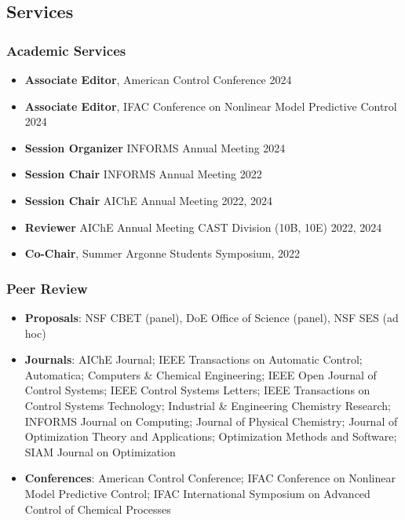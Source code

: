 \subsection*{Services}
\subsubsection*{Academic Services}
\begin{itemize}[leftmargin=*,itemsep=-1pt]
  \item[] \textbf{Associate Editor}, American Control Conference \hfill 2024
  \item[] \textbf{Associate Editor}, IFAC Conference on Nonlinear Model Predictive Control \hfill 2024
\item[] \textbf{Session Organizer} INFORMS Annual Meeting \hfill 2024
\item[] \textbf{Session Chair} INFORMS Annual Meeting \hfill 2022
\item[] \textbf{Session Chair} AIChE Annual Meeting \hfill 2022, 2024
\item[] \textbf{Reviewer} AIChE Annual Meeting CAST Division (10B, 10E) \hfill 2022, 2024
\item[] \textbf{Co-Chair}, Summer Argonne Students Symposium, \hfill 2022
\end{itemize}

\subsubsection*{Peer Review}
\begin{itemize}[itemsep=1pt, parsep=0pt,leftmargin=*]
\item[] \textbf{Proposals}: NSF CBET (panel), DoE Office of Science (panel), NSF SES (ad hoc)
\item[] \textbf{Journals}: AIChE Journal; IEEE Transactions on Automatic Control; Automatica; Computers \& Chemical Engineering; IEEE Open Journal of Control Systems; IEEE Control Systems Letters; IEEE Transactions on Control Systems Technology; Industrial \& Engineering Chemistry Research; INFORMS Journal on Computing; Journal of Physical Chemistry; Journal of Optimization Theory and Applications; Optimization Methods and Software; SIAM Journal on Optimization
\item[] \textbf{Conferences}: American Control Conference; IFAC Conference on Nonlinear Model Predictive Control; IFAC International Symposium on Advanced Control of Chemical Processes 
\end{itemize}  
